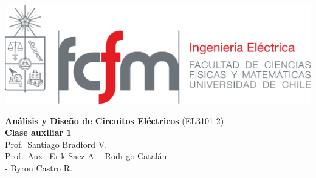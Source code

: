 \documentclass[
  11pt,
  letterpaper,
   addpoints,
  ]{exam}
\begin{document}
\noindent
\begin{minipage}{0.47\textwidth}
\includegraphics[width=\textwidth]{../fcfm_die}
\end{minipage}
\begin{minipage}{0.53\textwidth}
    
\begin{center} 
\large\textbf{Análisis y Diseño de Circuitos Eléctricos} (EL3101-2) \\
\large\textbf{Clase auxiliar 1} \\
\normalsize Prof.~Santiago Bradford V.\\
\normalsize Prof.~Aux.~Erik Saez A. - Rodrigo Catalán\\
             - Byron Castro R.
\end{center}
\end{minipage}

\vspace{0.5cm}
\noindent
\vspace{.85cm}
\end{document}
